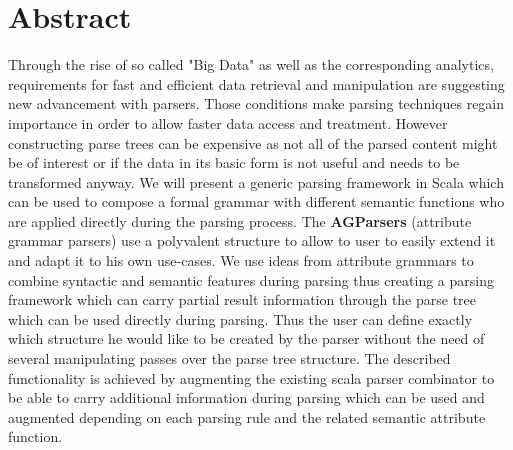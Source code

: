 \section{Abstract}
Through the rise of so called "Big Data" as well as the corresponding analytics, requirements for fast and efficient data retrieval and manipulation are suggesting new advancement with parsers. Those conditions make parsing techniques regain importance in order to allow faster data access and treatment. However constructing parse trees can be expensive as not all of the parsed content might be of interest or if the data in its basic form is not useful and needs to be transformed anyway.
We will present a generic parsing framework in Scala which can be used to compose a formal grammar with different semantic functions who are applied directly during the parsing process. The \textbf{AGParsers} (attribute grammar parsers) use a polyvalent structure to allow to user to easily extend it and adapt it to his own use-cases.
We use ideas from attribute grammars to combine syntactic and semantic features during parsing thus creating a parsing framework which can carry partial result information through the parse tree which can be used directly during parsing. Thus the user can define exactly which structure he would like to be created by the parser without the need of several manipulating passes over the parse tree structure.
The described functionality is achieved by augmenting the existing scala parser combinator to be able to carry additional information during parsing which can be used and augmented depending on each parsing rule and the related semantic attribute function.
